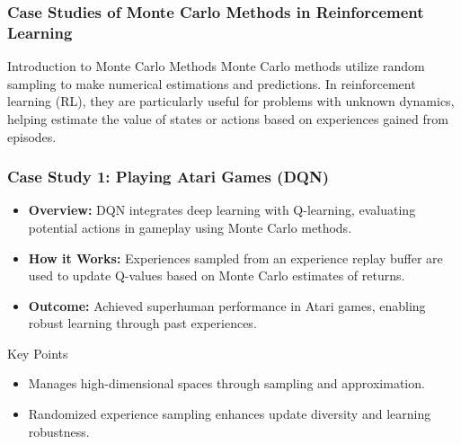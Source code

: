 \documentclass[aspectratio=169]{beamer}
\begin{document}
\begin{frame}[fragile]
    \frametitle{Case Studies of Monte Carlo Methods in Reinforcement Learning}
    \begin{block}{Introduction to Monte Carlo Methods}
        Monte Carlo methods utilize random sampling to make numerical estimations and predictions. In reinforcement learning (RL), they are particularly useful for problems with unknown dynamics, helping estimate the value of states or actions based on experiences gained from episodes.
    \end{block}
\end{frame}

\begin{frame}[fragile]
    \frametitle{Case Study 1: Playing Atari Games (DQN)}
    \begin{itemize}
        \item \textbf{Overview:} DQN integrates deep learning with Q-learning, evaluating potential actions in gameplay using Monte Carlo methods.
        \item \textbf{How it Works:} Experiences sampled from an experience replay buffer are used to update Q-values based on Monte Carlo estimates of returns.
        \item \textbf{Outcome:} Achieved superhuman performance in Atari games, enabling robust learning through past experiences.
    \end{itemize}
    \begin{block}{Key Points}
        \begin{itemize}
            \item Manages high-dimensional spaces through sampling and approximation.
            \item Randomized experience sampling enhances update diversity and learning robustness.
        \end{itemize}
    \end{block}
\end{frame}
\end{document}
